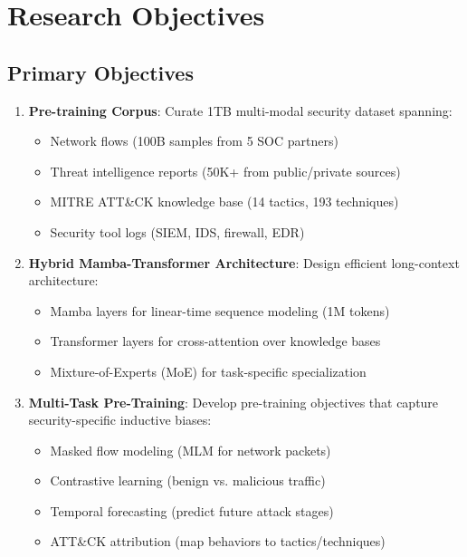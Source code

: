 \documentclass[11pt]{article}
\begin{document}
\section{Research Objectives}

\subsection{Primary Objectives}

\begin{enumerate}[label=\textbf{O\arabic*.},leftmargin=*]
    \item \textbf{Pre-training Corpus}: Curate 1TB multi-modal security dataset spanning:
    \begin{itemize}
        \item Network flows (100B samples from 5 SOC partners)
        \item Threat intelligence reports (50K+ from public/private sources)
        \item MITRE ATT\&CK knowledge base (14 tactics, 193 techniques)
        \item Security tool logs (SIEM, IDS, firewall, EDR)
    \end{itemize}

    \item \textbf{Hybrid Mamba-Transformer Architecture}: Design efficient long-context architecture:
    \begin{itemize}
        \item Mamba layers for linear-time sequence modeling (1M tokens)
        \item Transformer layers for cross-attention over knowledge bases
        \item Mixture-of-Experts (MoE) for task-specific specialization
    \end{itemize}

    \item \textbf{Multi-Task Pre-Training}: Develop pre-training objectives that capture security-specific inductive biases:
    \begin{itemize}
        \item Masked flow modeling (MLM for network packets)
        \item Contrastive learning (benign vs. malicious traffic)
        \item Temporal forecasting (predict future attack stages)
        \item ATT\&CK attribution (map behaviors to tactics/techniques)
    \end{itemize}


\end{enumerate}
\end{document}
